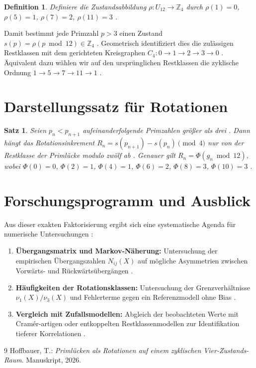 \documentclass[11pt,a4paper]{article}
\newtheorem{theorem}{Satz}
\newtheorem{definition}{Definition}
\begin{document}
	\begin{definition}
		Definiere die Zustandsabbildung $\rho:U_{12}\rightarrow \mathbb{Z}_4$ durch $\rho(1)=0$, $\rho(5)=1$, $\rho(7)=2$, $\rho(11)=3$ \cite{hofbauer_gap}.
	\end{definition}
	
	Damit bestimmt jede Primzahl $p>3$ einen Zustand $s(p)=\rho(p\bmod 12)\in\mathbb{Z}_4$ \cite{hofbauer_gap}. Geometrisch identifiziert dies die zulässigen Restklassen mit dem gerichteten Kreisgraphen $C_4: 0\rightarrow1\rightarrow2\rightarrow3\rightarrow0$ \cite{hofbauer_gap}. Äquivalent dazu wählen wir auf den ursprünglichen Restklassen die zyklische Ordnung $1\to5\to7\to11\to1$ \cite{hofbauer_gap}.
	
	\section{Darstellungssatz für Rotationen}
	\begin{theorem}
		Seien $p_n<p_{n+1}$ aufeinanderfolgende Primzahlen größer als drei \cite{hofbauer_gap}. Dann hängt das Rotationsinkrement $R_n=s(p_{n+1})-s(p_n)\pmod 4$ nur von der Restklasse der Primlücke modulo zwölf ab \cite{hofbauer_gap}. Genauer gilt $R_n=\Phi(g_n\bmod 12)$, wobei $\Phi(0)=0$, $\Phi(2)=1$, $\Phi(4)=1$, $\Phi(6)=2$, $\Phi(8)=3$, $\Phi(10)=3$ \cite{hofbauer_gap}.
	\end{theorem}
	
	\section{Forschungsprogramm und Ausblick}
	Aus dieser exakten Faktorisierung ergibt sich eine systematische Agenda für numerische Untersuchungen \cite{hofbauer_gap}:
	\begin{enumerate}[label=\textbf{F\arabic*:}]
		\item \textbf{Übergangsmatrix und Markov-Näherung:} Untersuchung der empirischen Übergangszahlen $N_{ij}(X)$ auf mögliche Asymmetrien zwischen Vorwärts- und Rückwärtsübergängen \cite{hofbauer_gap}.
		\item \textbf{Häufigkeiten der Rotationsklassen:} Untersuchung der Grenzverhältnisse $\nu_1(X)/\nu_3(X)$ und Fehlerterme gegen ein Referenzmodell ohne Bias \cite{hofbauer_gap}.
		\item \textbf{Vergleich mit Zufallsmodellen:} Abgleich der beobachteten Werte mit Cramér-artigen oder entkoppelten Restklassenmodellen zur Identifikation tieferer Korrelationen \cite{hofbauer_gap}.
	\end{enumerate}
	
	\begin{thebibliography}{9}
		 Hoffbauer, T.: \emph{Primlücken als Rotationen auf einem zyklischen Vier-Zustands-Raum}. Manuskript, 2026.
	\end{thebibliography}
	
\end{document}
